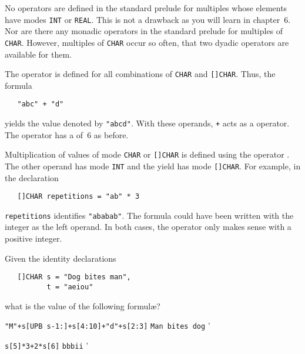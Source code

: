 No operators are defined in the standard prelude for multiples whose
elements have modes \verb|INT| or \verb|REAL|. This is not a drawback
as you will learn in chapter~6. Nor are there any monadic operators
in the standard prelude for multiples of \verb|CHAR|. However,
multiples of \verb|CHAR| occur so often, that two dyadic operators
are available for them.

The operator \ixtt{+} is defined for all combinations of \verb|CHAR|
and \verb|[]CHAR|.  Thus, the formula
\begin{verbatim}
   "abc" + "d"
\end{verbatim}
\noindent
yields the value denoted by \verb|"abcd"|. With these operands,
\verb|+| acts as a  operator. The operator has a
 of~6 as before.

Multiplication of values of mode \verb|CHAR| or \verb|[]CHAR| is
defined using the operator \ixtt{*}. The other operand has mode
\verb|INT| and the yield has mode \verb|[]CHAR|. For example, in the
declaration
\begin{verbatim}
   []CHAR repetitions = "ab" * 3
\end{verbatim}
\noindent
\verb|repetitions| identifies \verb|"ababab"|.  The formula could
have been written with the integer as the left operand.  In both
cases, the operator only makes sense with a positive integer.

\begin{exercise}
\item Given the identity declarations
\begin{verbatim}
   []CHAR s = "Dog bites man",
          t = "aeiou"
\end{verbatim}
\noindent
what is the value of the following formul{\ae}?
\begin{subex}
\item \verb|"M"+s[UPB s-1:]+s[4:10]+"d"+s[2:3]|
\subans \verb|Man bites dog|
'
\item \verb|s[5]*3+2*s[6]| \subans \verb|bbbii|
'
\end{subex}
\end{exercise}


